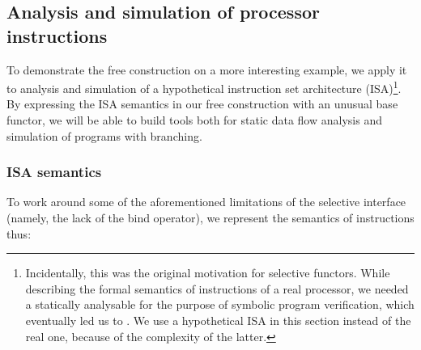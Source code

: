 




\subsection{Analysis and simulation of processor instructions}\label{sec-free-isa}

To demonstrate the free construction on a more interesting example, we apply it
to analysis and simulation of a hypothetical instruction set architecture
(ISA)\footnote{Incidentally, this was the original motivation for selective
functors. While describing the formal semantics of instructions of a real
processor, we needed a statically analysable  for the purpose of
symbolic program verification, which eventually led us to . We use a
hypothetical ISA in this section instead of the real one, because of the
complexity of the latter.}. By expressing the ISA semantics in our
free construction with an unusual base functor, we will be able to build
tools both for static data flow analysis and simulation of programs with
branching.

\subsubsection{ISA semantics}

To work around some of the aforementioned limitations of the selective
interface (namely, the lack of the bind operator), we represent the semantics of
instructions thus:

